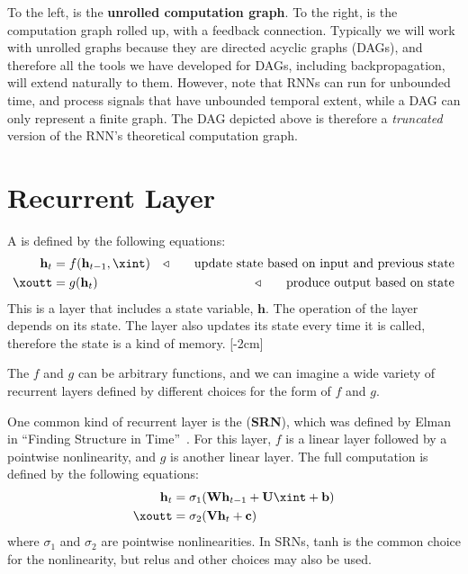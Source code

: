 To the left, is the {\bf unrolled computation graph}. To the right, is the computation graph rolled up, with a feedback connection. Typically we will work with unrolled graphs because they are directed acyclic graphs (DAGs), and therefore all the tools we have developed for DAGs, including backpropagation, will extend naturally to them. However, note that RNNs can run for unbounded time, and process signals that have unbounded temporal extent, while a DAG can only represent a finite graph. The DAG depicted above is therefore a \textit{truncated} version of the RNN's theoretical computation graph.

\section{Recurrent Layer}
A  is defined by the following equations:
\begin{align}
    \mathbf{h}_t &= f(\mathbf{h}_{t-1}, \xint) &\triangleleft \quad\quad \text{update state based on input and previous state}\\
    \xoutt &= g(\mathbf{h}_t) &\triangleleft \quad\quad \text{produce output based on state}
\end{align}
This is a layer that includes a state variable, $\mathbf{h}$. The operation of the layer depends on its state. The layer also updates its state every time it is called, therefore the state is a kind of memory.
[-2cm]

The $f$ and $g$ can be arbitrary functions, and we can imagine a wide variety of recurrent layers defined by different choices for the form of $f$ and $g$.

One common kind of recurrent layer is the  ({\bf SRN}), which was defined by Elman in ``Finding Structure in Time''~\cite{elman1990finding}. For this layer, $f$ is a linear layer followed by a pointwise nonlinearity, and $g$ is another linear layer. The full computation is defined by the following equations:
\begin{align}
    \mathbf{h}_t &= \sigma_1(\mathbf{W}\mathbf{h}_{t-1} + \mathbf{U}\xint + \mathbf{b})\\
    \xoutt &= \sigma_2(\mathbf{V}\mathbf{h}_t + \mathbf{c})
\end{align}
where $\sigma_1$ and $\sigma_2$ are pointwise nonlinearities. In SRNs, tanh is the common choice for the nonlinearity, but relus and other choices may also be used.


